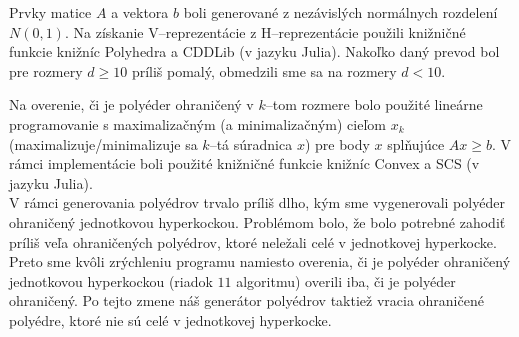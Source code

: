 Prvky matice $A$ a vektora $b$ boli generované z nezávislých normálnych rozdelení $N(0,1)$. Na získanie V--reprezentácie z H--reprezentácie použili knižničné funkcie knižníc Polyhedra a CDDLib (v jazyku Julia). Nakoľko daný prevod bol pre rozmery $d \geq 10$ príliš pomalý, obmedzili sme sa na rozmery $d <10$.

Na overenie, či je polyéder ohraničený v $k$--tom rozmere bolo použité lineárne programovanie s maximalizačným (a minimalizačným) cieľom $x_k$ (maximalizuje/minimalizuje sa $k$--tá súradnica $x$) pre body $x$ splňujúce $Ax \geq b$. V rámci implementácie boli použité knižničné funkcie knižníc Convex a SCS (v jazyku Julia).\\

V rámci generovania polyédrov trvalo príliš dlho, kým sme vygenerovali polyéder ohraničený jednotkovou hyperkockou. Problémom bolo, že bolo potrebné zahodiť príliš veľa ohraničených polyédrov, ktoré neležali celé v jednotkovej hyperkocke. Preto sme kvôli zrýchleniu programu namiesto overenia, či je polyéder ohraničený jednotkovou hyperkockou (riadok $11$ algoritmu) overili iba, či je polyéder ohraničený.
Po tejto zmene náš generátor polyédrov taktiež vracia ohraničené polyédre, ktoré nie sú celé v jednotkovej hyperkocke. \\


